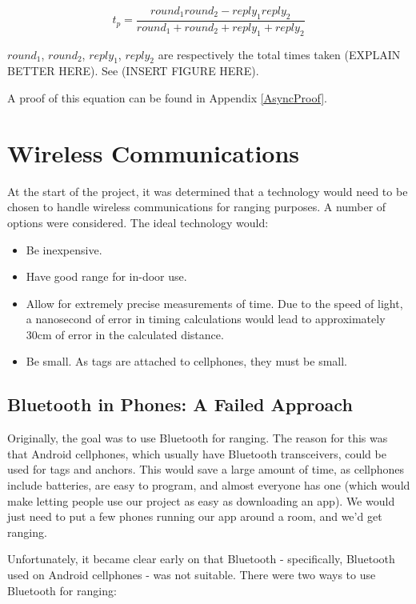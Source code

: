 \[
	t_p = \frac{round_1  round_2 - reply_1 reply_2}{ round_1 + round_2 + reply_1 + reply_2}
\]

$round_1$, $round_2$, $reply_1$, $reply_2$ are respectively the total times taken (EXPLAIN BETTER HERE). See (INSERT FIGURE HERE).
 
A proof of this equation can be found in Appendix \ref{AsyncProof}.

\section{Wireless Communications}
At the start of the project, it was determined that a technology would need to be chosen to handle wireless communications for ranging purposes. A number of options were considered. The ideal technology would:
\begin{itemize}
	\item Be inexpensive.
	\item Have good range for in-door use.
	\item Allow for extremely precise measurements of time. Due to the speed of light, a nanosecond of error in timing calculations would lead to approximately 30cm of error in the calculated distance.
	\item Be small. As tags are attached to cellphones, they must be small.
\end{itemize}

\subsection{Bluetooth in Phones: A Failed Approach}
Originally, the goal was to use Bluetooth for ranging. The reason for this was that Android cellphones, which usually have Bluetooth transceivers, could be used for tags and anchors. This would save a large amount of time, as cellphones include batteries, are easy to program, and almost everyone has one (which would make letting people use our project as easy as downloading an app). We would just need to put a few phones running our app around a room, and we'd get ranging.

Unfortunately, it became clear early on that Bluetooth - specifically, Bluetooth used on Android cellphones - was not suitable. There were two ways to use Bluetooth for ranging: 

